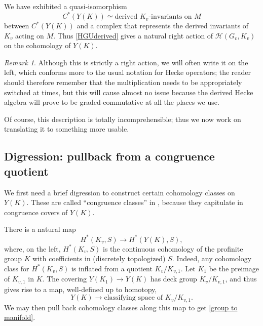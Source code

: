 \documentclass[10pt]{amsart}
\theoremstyle{remark}
\newtheorem*{remark}{Remark}
\begin{document}
 
We have exhibited
a quasi-isomorphism
$$C^*(Y(K)) \simeq \mbox{derived $K_v$-invariants on $M$}$$
between $C^*(Y(K))$ and a complex that represents the derived invariants of $K_v$ acting on $M$.  Thus \eqref{HGUderived} 
gives a natural right action of $\mathscr{H}(G_v, K_v)$ on the   cohomology  of $Y(K)$.  

\begin{remark}
Although this is strictly a right action,  we will often write it on the left,  which conforms more to the usual notation for Hecke operators;
the reader should therefore remember that the multiplication needs to be appropriately switched at times, but
this will cause almost no issue because the derived Hecke algebra will prove to be graded-commutative at all the places we use. 
\end{remark}

Of course, this description is totally incomprehensible; thus we now work on translating it to something more usable.


\subsection{Digression: pullback from a congruence quotient} \label{cong-class}
 We first need a brief digression to construct certain cohomology classes on $Y(K)$. These are called ``congruence classes''  
 in \cite{CaVe}, because they capitulate in congruence covers of $Y(K)$. 
 
 There is a natural map
\begin{equation} \label{group to manifold} H^*(K_v, S) \longrightarrow H^*(Y(K), S),\end{equation}
where, on the left, $H^*(K_v, S)$ is the continuous cohomology of the profinite group $K$ with coefficients in (discretely topologized) $S$. 
Indeed, any cohomology class for $H^*(K_v, S)$ is inflated from a quotient $K_v/K_{v,1}$. 
Let $K_1$ be the preimage of $K_{v,1}$ in $K$. 
The covering $Y(K_1) \rightarrow Y(K)$ has deck group $K_v/K_{v,1}$, and thus gives rise to a map, well-defined up to homotopy,
\begin{equation} \label{classifyingspacemap} Y(K) \longrightarrow \mbox{classifying space of $K_v/K_{v,1}$.}\end{equation}
We may then pull back cohomology classes along this map to get \eqref{group to manifold}.
\end{document}
